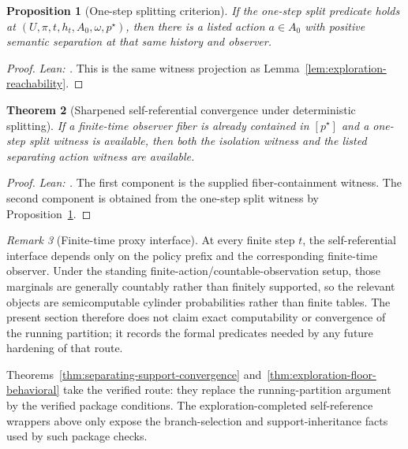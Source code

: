 \documentclass[11pt]{article}
\newtheorem{theorem}{Theorem}[section]
\newtheorem{proposition}[theorem]{Proposition}
\theoremstyle{definition}
\theoremstyle{remark}
\newtheorem{remark}[theorem]{Remark}
\theoremstyle{plain}
\theoremstyle{definition}
\begin{document}
\begin{proposition}[One-step splitting criterion]
\label{prop:self-ref-one-step-split}
If the one-step split predicate holds at $(U,\pi,t,h_t,A_0,\omega,p^\star)$, then there is a listed action $a\in A_0$ with positive semantic separation at that same history and observer.
\end{proposition}

\begin{proof}
\noindent\emph{Lean: .}
This is the same witness projection as Lemma~\ref{lem:exploration-reachability}.
\end{proof}

\begin{theorem}[Sharpened self-referential convergence under deterministic splitting]
\label{thm:self-ref-sharp}
If a finite-time observer fiber is already contained in $[p^\star]$ and a one-step split witness is available, then both the isolation witness and the listed separating action witness are available.
\end{theorem}

\begin{proof}
\noindent\emph{Lean: .}
The first component is the supplied fiber-containment witness. The second component is obtained from the one-step split witness by Proposition~\ref{prop:self-ref-one-step-split}.
\end{proof}

\begin{remark}[Finite-time proxy interface]
\label{rem:self-ref-computability}
At every finite step $t$, the self-referential interface depends only on the policy prefix and the corresponding finite-time observer. Under the standing finite-action/countable-observation setup, those marginals are generally countably rather than finitely supported, so the relevant objects are semicomputable cylinder probabilities rather than finite tables. The present section therefore does not claim exact computability or convergence of the running partition; it records the formal predicates needed by any future hardening of that route.
\par
Theorems~\ref{thm:separating-support-convergence} and~\ref{thm:exploration-floor-behavioral} take the verified route: they replace the running-partition argument by the verified package conditions. The exploration-completed self-reference wrappers above only expose the branch-selection and support-inheritance facts used by such package checks.
\end{remark}
\end{document}
